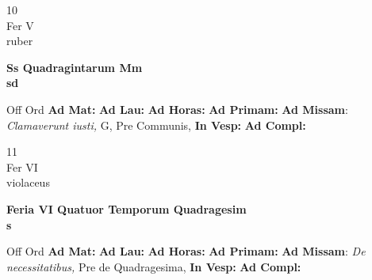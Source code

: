 \documentclass[10pt, openany]{book}
\begin{document}
        \begin{center}
            \begin{minipage}{3.5in}
                \vspace{2em}
                \begin{minipage}{0.5in}
                    {\Huge 10} \\
                    {\normalsize Fer V} \\
                    {\normalsize ruber}
                \end{minipage}
                \begin{minipage}{3.0in}
                    \textbf{ \large Ss Quadragintarum Mm \\
                    \textnormal{\normalsize sd}} \\ 
                \end{minipage}
                \begin{justify}Off Ord
                    \textbf{Ad Mat: }
                    \textbf{Ad Lau: }
                    \textbf{Ad Horas: }
                    \textbf{Ad Primam: }\textbf{Ad Missam}: \textit{Clamaverunt iusti,} G, Pre Communis,  
                    \textbf{In Vesp: }
                    \textbf{Ad Compl: }
                \end{justify}
            \end{minipage}
        \end{center}
    
        \begin{center}
            \begin{minipage}{3.5in}
                \vspace{2em}
                \begin{minipage}{0.5in}
                    {\Huge 11} \\
                    {\normalsize Fer VI} \\
                    {\normalsize violaceus}
                \end{minipage}
                \begin{minipage}{3.0in}
                    \textbf{ \large Feria VI Quatuor Temporum Quadragesim \\
                    \textnormal{\normalsize s}} \\ 
                \end{minipage}
                \begin{justify}Off Ord
                    \textbf{Ad Mat: }
                    \textbf{Ad Lau: }
                    \textbf{Ad Horas: }
                    \textbf{Ad Primam: }\textbf{Ad Missam}: \textit{De necessitatibus,} Pre de Quadragesima,  
                    \textbf{In Vesp: }
                    \textbf{Ad Compl: }
                \end{justify}
            \end{minipage}
        \end{center}
    
\end{document}
